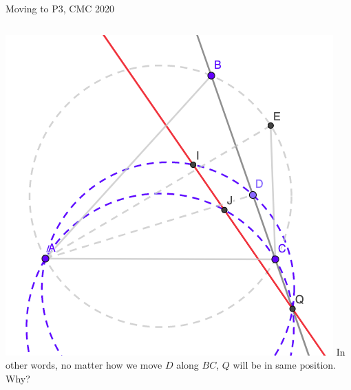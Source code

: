 \documentclass{beamer}
\begin{document}
\begin{frame}{Moving to P3, CMC 2020}
	\begin{columns}
		\includegraphics[scale=0.34]{spi11.png}
		In other words, no matter
		how we move $D$ along $BC$, $Q$ will be in same position.\\
		\phantom{Spacing}
		Why?
	\end{columns}
\end{frame}
\end{document}
